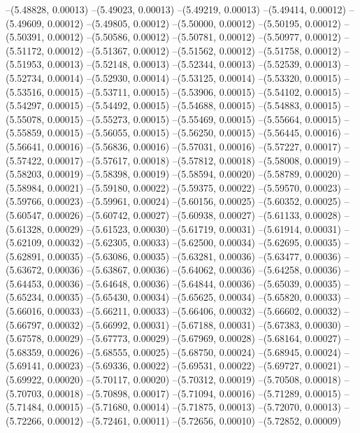 --(5.48828, 0.00013)
--(5.49023, 0.00013)
--(5.49219, 0.00013)
--(5.49414, 0.00012)
--(5.49609, 0.00012)
--(5.49805, 0.00012)
--(5.50000, 0.00012)
--(5.50195, 0.00012)
--(5.50391, 0.00012)
--(5.50586, 0.00012)
--(5.50781, 0.00012)
--(5.50977, 0.00012)
--(5.51172, 0.00012)
--(5.51367, 0.00012)
--(5.51562, 0.00012)
--(5.51758, 0.00012)
--(5.51953, 0.00013)
--(5.52148, 0.00013)
--(5.52344, 0.00013)
--(5.52539, 0.00013)
--(5.52734, 0.00014)
--(5.52930, 0.00014)
--(5.53125, 0.00014)
--(5.53320, 0.00015)
--(5.53516, 0.00015)
--(5.53711, 0.00015)
--(5.53906, 0.00015)
--(5.54102, 0.00015)
--(5.54297, 0.00015)
--(5.54492, 0.00015)
--(5.54688, 0.00015)
--(5.54883, 0.00015)
--(5.55078, 0.00015)
--(5.55273, 0.00015)
--(5.55469, 0.00015)
--(5.55664, 0.00015)
--(5.55859, 0.00015)
--(5.56055, 0.00015)
--(5.56250, 0.00015)
--(5.56445, 0.00016)
--(5.56641, 0.00016)
--(5.56836, 0.00016)
--(5.57031, 0.00016)
--(5.57227, 0.00017)
--(5.57422, 0.00017)
--(5.57617, 0.00018)
--(5.57812, 0.00018)
--(5.58008, 0.00019)
--(5.58203, 0.00019)
--(5.58398, 0.00019)
--(5.58594, 0.00020)
--(5.58789, 0.00020)
--(5.58984, 0.00021)
--(5.59180, 0.00022)
--(5.59375, 0.00022)
--(5.59570, 0.00023)
--(5.59766, 0.00023)
--(5.59961, 0.00024)
--(5.60156, 0.00025)
--(5.60352, 0.00025)
--(5.60547, 0.00026)
--(5.60742, 0.00027)
--(5.60938, 0.00027)
--(5.61133, 0.00028)
--(5.61328, 0.00029)
--(5.61523, 0.00030)
--(5.61719, 0.00031)
--(5.61914, 0.00031)
--(5.62109, 0.00032)
--(5.62305, 0.00033)
--(5.62500, 0.00034)
--(5.62695, 0.00035)
--(5.62891, 0.00035)
--(5.63086, 0.00035)
--(5.63281, 0.00036)
--(5.63477, 0.00036)
--(5.63672, 0.00036)
--(5.63867, 0.00036)
--(5.64062, 0.00036)
--(5.64258, 0.00036)
--(5.64453, 0.00036)
--(5.64648, 0.00036)
--(5.64844, 0.00036)
--(5.65039, 0.00035)
--(5.65234, 0.00035)
--(5.65430, 0.00034)
--(5.65625, 0.00034)
--(5.65820, 0.00033)
--(5.66016, 0.00033)
--(5.66211, 0.00033)
--(5.66406, 0.00032)
--(5.66602, 0.00032)
--(5.66797, 0.00032)
--(5.66992, 0.00031)
--(5.67188, 0.00031)
--(5.67383, 0.00030)
--(5.67578, 0.00029)
--(5.67773, 0.00029)
--(5.67969, 0.00028)
--(5.68164, 0.00027)
--(5.68359, 0.00026)
--(5.68555, 0.00025)
--(5.68750, 0.00024)
--(5.68945, 0.00024)
--(5.69141, 0.00023)
--(5.69336, 0.00022)
--(5.69531, 0.00022)
--(5.69727, 0.00021)
--(5.69922, 0.00020)
--(5.70117, 0.00020)
--(5.70312, 0.00019)
--(5.70508, 0.00018)
--(5.70703, 0.00018)
--(5.70898, 0.00017)
--(5.71094, 0.00016)
--(5.71289, 0.00015)
--(5.71484, 0.00015)
--(5.71680, 0.00014)
--(5.71875, 0.00013)
--(5.72070, 0.00013)
--(5.72266, 0.00012)
--(5.72461, 0.00011)
--(5.72656, 0.00010)
--(5.72852, 0.00009)
